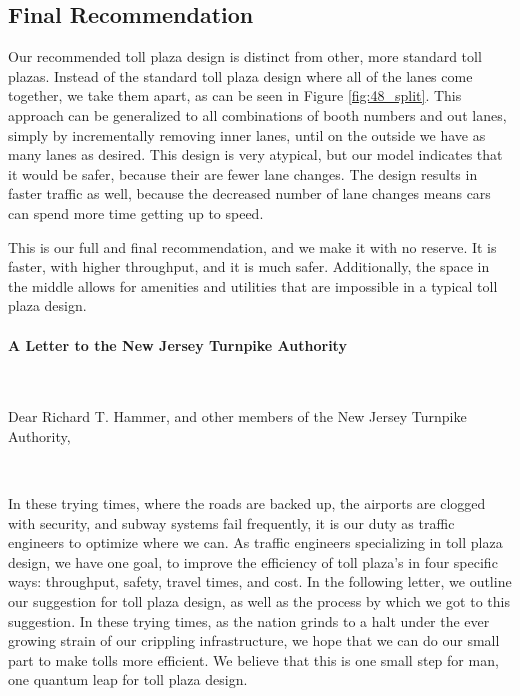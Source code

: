\documentclass[a4paper, 11pt]{article}
\begin{document}
\subsection{Final Recommendation}
\label{final_rec}

Our recommended toll plaza design is distinct from other, more standard toll plazas. Instead of the standard toll plaza design where all of the lanes come together, we take them apart, as can be seen in Figure \ref{fig:48_split}. This approach can be generalized to all combinations of booth numbers and out lanes, simply by incrementally removing inner lanes, until on the outside we have as many lanes as desired. This design is very atypical, but our model indicates that it would be safer, because their are fewer lane changes. The design results in faster traffic as well, because the decreased number of lane changes means cars can spend more time getting up to speed. 

This is our full and final recommendation, and we make it with no reserve. It is faster, with higher throughput, and it is much safer. Additionally, the space in the middle allows for amenities and utilities that are impossible in a typical toll plaza design. 

\newpage

%
%
%
%
%
%
%
%
%
%
%
%
%
%
%
%
%
%
%
%
%
%
%
%

\paragraph{A Letter to the New Jersey Turnpike Authority}

\

Dear Richard T. Hammer, and other members of the New Jersey Turnpike Authority,

\ 

In these trying times, where the roads are backed up, the airports are clogged with security, and subway systems fail frequently, it is our duty as traffic engineers to optimize where we can. As traffic engineers specializing in toll plaza design, we have one goal, to improve the efficiency of toll plaza's in four specific ways: throughput, safety, travel times, and cost. In the following letter, we outline our suggestion for toll plaza design, as well as the process by which we got to this suggestion. In these trying times, as the nation grinds to a halt under the ever growing strain of our crippling infrastructure, we hope that we can do our small part to make tolls more efficient. 
We believe that this is one small step for man, one quantum leap for toll plaza design.
\end{document}
